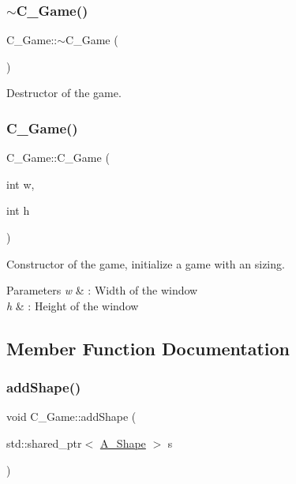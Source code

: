 \subsubsection{\texorpdfstring{$\sim$\+C\+\_\+\+Game()}{~C\_Game()}\hspace{0.1cm}{\footnotesize\ttfamily [2/2]}}
{\footnotesize\ttfamily C\+\_\+\+Game\+::$\sim$\+C\+\_\+\+Game (\begin{DoxyParamCaption}{ }\end{DoxyParamCaption})}



Destructor of the game. 

\mbox{\label{classC__Game_ac5a1aba1deb606a281d3992459566716}} 
\subsubsection{\texorpdfstring{C\+\_\+\+Game()}{C\_Game()}\hspace{0.1cm}{\footnotesize\ttfamily [2/2]}}
{\footnotesize\ttfamily C\+\_\+\+Game\+::\+C\+\_\+\+Game (\begin{DoxyParamCaption}\item[{int}]{w,  }\item[{int}]{h }\end{DoxyParamCaption})}



Constructor of the game, initialize a game with an sizing. 


\begin{DoxyParams}{Parameters}
{\em w} & \+: Width of the window \\
\hline
{\em h} & \+: Height of the window \\
\hline
\end{DoxyParams}


\subsection{Member Function Documentation}
\mbox{\label{classC__Game_ad2b7512192879ec7cd76d4eed4fef938}} 
\subsubsection{\texorpdfstring{add\+Shape()}{addShape()}\hspace{0.1cm}{\footnotesize\ttfamily [1/2]}}
{\footnotesize\ttfamily void C\+\_\+\+Game\+::add\+Shape (\begin{DoxyParamCaption}\item[{std\+::shared\+\_\+ptr$<$ \hyperlink{classA__Shape}{A\+\_\+\+Shape} $>$}]{s }\end{DoxyParamCaption})}



